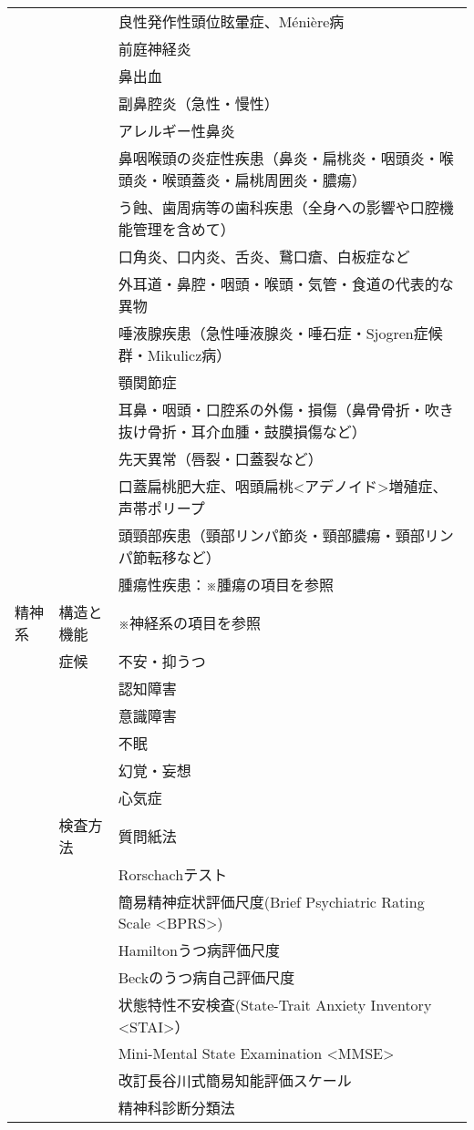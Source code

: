 \begin{xltabular}{\linewidth}{XXX}
 &  & 良性発作性頭位眩暈症、Ménière病 \\
 &  & 前庭神経炎 \\
 &  & 鼻出血 \\
 &  & 副鼻腔炎（急性・慢性） \\
 &  & アレルギー性鼻炎 \\
 &  & 鼻咽喉頭の炎症性疾患（鼻炎・扁桃炎・咽頭炎・喉頭炎・喉頭蓋炎・扁桃周囲炎・膿瘍） \\
 &  & う蝕、歯周病等の歯科疾患（全身への影響や口腔機能管理を含めて） \\
 &  & 口角炎、口内炎、舌炎、鵞口瘡、白板症など \\
 &  & 外耳道・鼻腔・咽頭・喉頭・気管・食道の代表的な異物 \\
 &  & 唾液腺疾患（急性唾液腺炎・唾石症・Sjogren症候群・Mikulicz病） \\
 &  & 顎関節症 \\
 &  & 耳鼻・咽頭・口腔系の外傷・損傷（鼻骨骨折・吹き抜け骨折・耳介血腫・鼓膜損傷など） \\
 &  & 先天異常（唇裂・口蓋裂など） \\
 &  & 口蓋扁桃肥大症、咽頭扁桃<アデノイド>増殖症、声帯ポリープ \\
 &  & 頭頸部疾患（頸部リンパ節炎・頸部膿瘍・頸部リンパ節転移など） \\
 &  & 腫瘍性疾患：※腫瘍の項目を参照 \\
精神系 & 構造と機能 & ※神経系の項目を参照 \\
 & 症候 & 不安・抑うつ \\
 &  & 認知障害 \\
 &  & 意識障害 \\
 &  & 不眠 \\
 &  & 幻覚・妄想 \\
 &  & 心気症 \\
 & 検査方法 & 質問紙法 \\
 &  & Rorschachテスト \\
 &  & 簡易精神症状評価尺度(Brief Psychiatric Rating Scale <BPRS>) \\
 &  & Hamiltonうつ病評価尺度 \\
 &  & Beckのうつ病自己評価尺度 \\
 &  & 状態特性不安検査(State-Trait Anxiety Inventory　 <STAI>） \\
 &  & Mini-Mental State Examination <MMSE> \\
 &  & 改訂長谷川式簡易知能評価スケール \\
 &  & 精神科診断分類法 \\

\end{xltabular}
